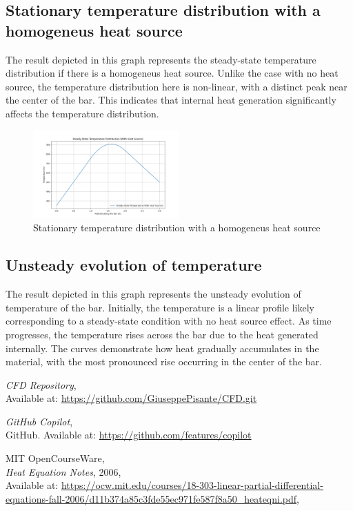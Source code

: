 \documentclass{article}
\begin{document}
\subsection{Stationary temperature distribution with a homogeneus heat source}

The result depicted in this graph represents the steady-state temperature distribution if there is a homogeneus heat source.
Unlike the case with no heat source, the temperature distribution here is non-linear, with a distinct peak near the center of the bar. 
This indicates that internal heat generation significantly affects the temperature distribution.

\begin{figure}[h!]
  \centering
  \includegraphics[width=0.5\textwidth]{Figure_2.png}
  \caption{Stationary temperature distribution with a homogeneus heat source}
  \label{fig: Stationary temperature distribution with a homogeneus heat source}
\end{figure}

\subsection{Unsteady evolution of temperature}

The result depicted in this graph represents the unsteady evolution of temperature of the bar. Initially, the temperature is a linear profile 
likely corresponding to a steady-state condition with no heat source effect. As time progresses, the temperature rises across the bar due to 
the heat generated internally. The curves demonstrate how heat gradually accumulates in the material, with the most pronounced rise occurring 
in the center of the bar.

\begin{thebibliography}{9}
  \textit{CFD Repository},\\
  Available at: \url{https://github.com/GiuseppePisante/CFD.git}
  
  \textit{GitHub Copilot},\\
  GitHub. Available at: \url{https://github.com/features/copilot}
  
  MIT OpenCourseWare,\\
  \textit{Heat Equation Notes}, 2006,\\
  Available at: \url{https://ocw.mit.edu/courses/18-303-linear-partial-differential-equations-fall-2006/d11b374a85c3fde55ec971fe587f8a50_heateqni.pdf},\\
\end{thebibliography}
\end{document}
